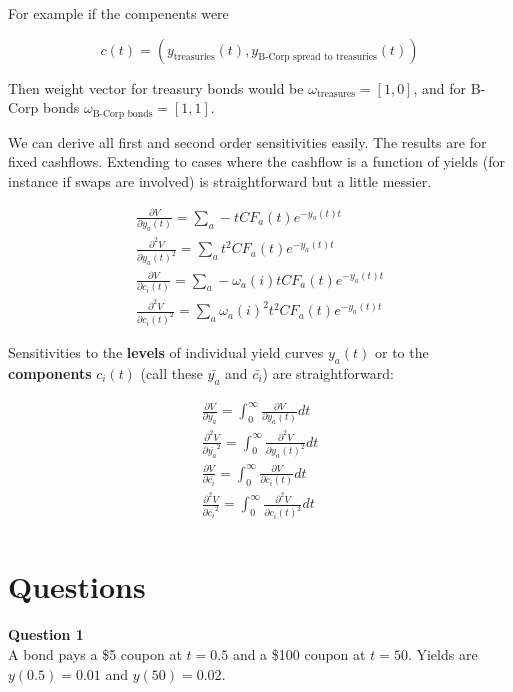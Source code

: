 For example if the compenents were 

\[c(t) = (y_{\textrm{treasuries}}(t),y_{\textrm{B-Corp spread to treasuries}}(t))\] 

Then weight vector for treasury bonds would be $\omega_{\textrm{treasures}} = [1, 0]$, and for B-Corp bonds $\omega_{\textrm{B-Corp bonds}} = [1,1]$.

We can derive all first and second order sensitivities easily. The results are for fixed cashflows. Extending to cases where the cashflow is a function of yields (for instance if swaps are involved) is straightforward but a little messier.

\begin{eqnarray*}
\frac{\partial V}{\partial y_a(t)} = \sum_a -t CF_a(t) e^{-y_a(t)t}\\
\frac{\partial^2 V}{\partial y_a(t)^2} = \sum_a t^2 CF_a(t) e^{-y_a(t)t}\\
\frac{\partial V}{\partial c_i(t)} = \sum_a -\omega_a(i) t CF_a(t) e^{-y_a(t)t}\\
\frac{\partial^2 V}{\partial c_i(t)^2} = \sum_a \omega_a(i)^2t^2 CF_a(t) e^{-y_a(t)t}
\end{eqnarray*}

Sensitivities to the \textbf{levels} of individual yield curves $y_a(t)$ or to the \textbf{components} $c_i(t)$ (call these $\bar{y_a}$ and $\bar{c_i}$) are straightforward:

\begin{eqnarray*}
\frac{\partial V}{\partial \bar{y_a}} = \int_0^{\infty}\frac{\partial V}{\partial y_a(t)}dt\\
\frac{\partial^2 V}{\partial \bar{y_a}^2} = \int_0^{\infty}\frac{\partial^2 V}{\partial y_a(t)^2}dt\\
\frac{\partial V}{\partial \bar{c_i}} = \int_0^{\infty}\frac{\partial V}{\partial c_i(t)}dt\\
\frac{\partial^2 V}{\partial \bar{c_i}^2} = \int_0^{\infty}\frac{\partial^2 V}{\partial c_i(t)^2}dt\\
\end{eqnarray*}


\section{Questions}

\textbf{Question 1}\\

A bond pays a \$5 coupon at $t=0.5$ and a \$100 coupon at $t=50$. Yields are $y(0.5) = 0.01$ and $y(50) = 0.02$.

